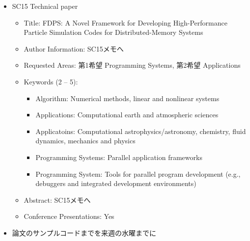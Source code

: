 \begin{itemize}
\item SC15 Technical paper
  \begin{itemize}
  \item Title: FDPS: A Novel Framework for Developing High-Performance
    Particle Simulation Codes for Distributed-Memory Systems
  \item Author Information: SC15メモへ
  \item Requested Areas: 第1希望 Programming Systems, 第2希望
    Applications
  \item Keywords (2 -- 5): 
    \begin{itemize}
    \item Algorithm: Numerical methods, linear and nonlinear systems
    \item Applications: Computational earth and atmospheric sciences
    \item Applicatoins: Computational astrophysics/astronomy,
      chemistry, fluid dynamics, mechanics and physics
    \item Programming Systems: Parallel application frameworks
    \item Programming System: Tools for parallel program development
      (e.g., debuggers and integrated development environments)
    \end{itemize}
  \item Abstract: SC15メモへ
  \item Conference Presentations: Yes
  \end{itemize}

\item 論文のサンプルコードまでを来週の水曜までに

\end{itemize}
